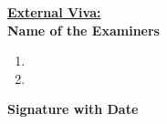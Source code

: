 \begin{titlepage}
\begin{multicols}{2}
\textup{\underline{\textbf{External Viva:}}} \\ 
\textup{\textbf{Name of the Examiners}} \\
\begin{enumerate}
\item{}
\item{}
\end{enumerate}
\columnbreak
\textup{\textbf{Signature with Date}}
\end{multicols}
\end{titlepage}